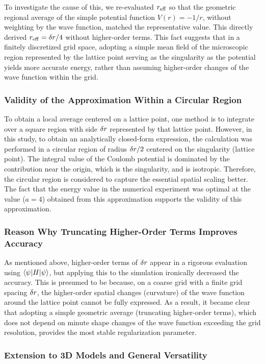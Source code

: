 \documentclass[wabun2025.tex]{subfiles}
\begin{document}
To investigate the cause of this, we re-evaluated $r_{\mathrm{eff}}$ so that the geometric
regional average of the simple potential function $V(r)=-1/r$, without weighting
by the wave function, matched the representative value. This directly derived
$r_{\mathrm{eff}}=\delta r/4$ without higher-order terms. This fact suggests that in a
finitely discretized grid space, adopting a simple mean field of the microscopic
region represented by the lattice point serving as the singularity as the
potential yields more accurate energy, rather than assuming higher-order changes
of the wave function within the grid.

\subsubsection{Validity of the Approximation Within a Circular Region}
To obtain a local average centered on a lattice point, one method is to
integrate over a square region with side $\delta r$ represented by that lattice
point. However, in this study, to obtain an analytically closed-form expression,
the calculation was performed in a circular region of radius $\delta r/2$
centered on the singularity (lattice point). The integral value of the Coulomb
potential is dominated by the contribution near the origin, which is the
singularity, and is isotropic. Therefore, the circular region is considered to
capture the essential spatial scaling better. The fact that the energy value in
the numerical experiment was optimal at the value ($a=4$) obtained from this
approximation supports the validity of this approximation.

\subsubsection{Reason Why Truncating Higher-Order Terms Improves Accuracy}
As mentioned above, higher-order terms of $\delta r$ appear in a rigorous
evaluation using $\braket{\psi|H|\psi}$, but applying this to the simulation
ironically decreased the accuracy. This is presumed to be because, on a coarse
grid with a finite grid spacing $\delta r$, the higher-order spatial changes
(curvature) of the wave function around the lattice point cannot be fully
expressed. As a result, it became clear that adopting a simple geometric average
(truncating higher-order terms), which does not depend on minute shape changes
of the wave function exceeding the grid resolution, provides the most stable
regularization parameter.

\subsubsection{Extension to 3D Models and General Versatility}
\label{subsec:discussion-3d-extension}
\end{document}
